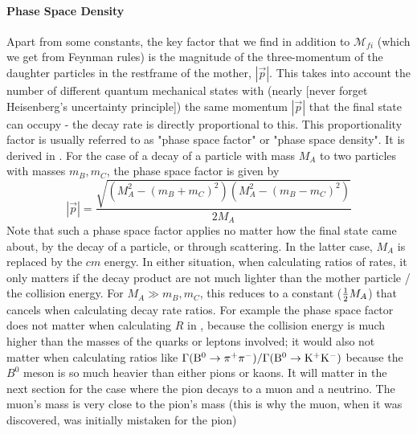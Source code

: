 \paragraph{Phase Space Density}
Apart from some constants, the key factor that we find in addition to $\mathcal{M}_{fi}$ (which we get from Feynman rules) is the magnitude of the three-momentum of the daughter particles in the restframe of the mother, $|\vec{p}|$. This takes into account the number of different quantum mechanical states with (nearly [never forget Heisenberg's uncertainty principle]) the same momentum $|\vec{p}|$ that the final state can occupy - the decay rate is directly proportional to this. This proportionality factor is usually referred to as "phase space factor" or "phase space density". It is derived in . 
For the case of a decay of a particle with mass $M_A$ to two particles with masses $m_B, m_C$, the phase space factor is given by
\begin{equation}
 |\vec{p}| = \frac{\sqrt{(M_A^2 - (m_B + m_C)^2)(M_A^2 - (m_B - m_C)^2)}}{2M_A}
\end{equation}
Note that such a phase space factor applies no matter how the final state came about, by the decay of a particle, or through scattering. 
In the latter case, $M_A$ is replaced by the $cm$ energy. In either situation, when calculating ratios of rates, it only matters if the decay product are not much lighter than the mother particle / the collision energy. For $M_A \gg m_B, m_C$, this reduces to a constant ($\frac{1}{2} M_A$) that cancels when calculating decay rate ratios. For example the phase space factor does not matter when calculating $R$ in , because the collision energy is much higher than the masses of the quarks or leptons involved; it would also not matter when calculating ratios like $\Gamma({\rm B^0 \to \pi^+ \pi^-})/\Gamma({\rm B^0 \to K^+ K^-})$ because the $B^0$ meson is so much heavier than either pions or kaons. 
It will matter in the next section for the case where the pion decays to a muon and a neutrino. The muon's mass is very close to the pion's mass (this is why the muon, when it was discovered, was initially mistaken for the pion)\\



